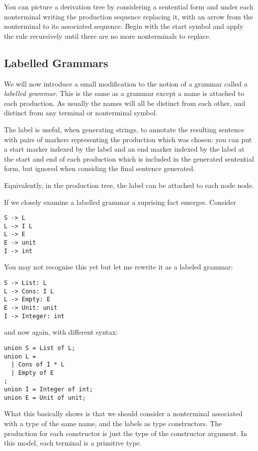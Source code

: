 \documentclass[oneside]{book}
\begin{document}
You can picture a derivation tree by considering a
sentential form and under each nonterminal writing
the production sequence replacing it, with an arrow
from the nonterminal to its associated sequence.
Begin with the start symbol and apply the rule recursively
until there are no more nonterminals to replace. 

\subsection{Labelled Grammars}

We will now introduce a small modification to the notion of
a grammar called a {\em labelled grammar}. This is the same
as a grammar except a name is attached to each production.
As usually the names will all be distinct from each other,
and distinct from any terminal or nonterminal symbol.

The label is useful, when generating strings, to annotate
the resulting sentence with pairs of markers representing
the production which was chosen: you can put a start marker
indexed by the label and an end marker indexed by the label
at the start and end of each production which is included
in the generated sentential form, but ignored when
considing the final sentence generated.

Equivalently, in the production tree, the label can be attached
to each node node.

If we closely examine a labelled grammar a suprising fact emerges.
Consider

\begin{verbatim}
S -> L
L -> I L
L -> E
E -> unit
I -> int
\end{verbatim}

You may not recognise this yet but let me rewrite it
as a labeled grammar:

\begin{verbatim}
S -> List: L
L -> Cons: I L
L -> Empty: E
E -> Unit: unit
I -> Integer: int
\end{verbatim}

and now again, with different syntax:

\begin{verbatim}
union S = List of L;
union L =
  | Cons of I * L
  | Empty of E
;
union I = Integer of int;
union E = Unit of unit;
\end{verbatim}

What this basically shows is that we should consider a nonterminal
associated with a type of the same name, and the labels as
type constructors. The production for each constructor is just 
the type of the constructor argument. In this model, each terminal
is a primitive type.
\end{document}
